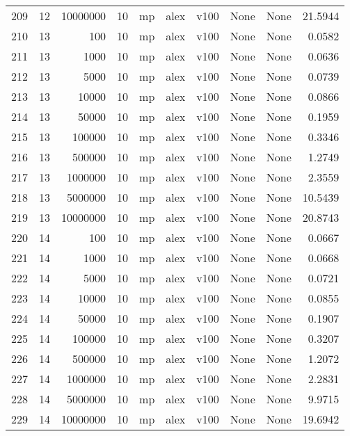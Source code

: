 \begin{tabular}{lrrrlllllr}
209 &  12 &  10000000 &      10 &   mp &  alex &  v100 &  None &  None &  21.5944 \\
210 &  13 &       100 &      10 &   mp &  alex &  v100 &  None &  None &   0.0582 \\
211 &  13 &      1000 &      10 &   mp &  alex &  v100 &  None &  None &   0.0636 \\
212 &  13 &      5000 &      10 &   mp &  alex &  v100 &  None &  None &   0.0739 \\
213 &  13 &     10000 &      10 &   mp &  alex &  v100 &  None &  None &   0.0866 \\
214 &  13 &     50000 &      10 &   mp &  alex &  v100 &  None &  None &   0.1959 \\
215 &  13 &    100000 &      10 &   mp &  alex &  v100 &  None &  None &   0.3346 \\
216 &  13 &    500000 &      10 &   mp &  alex &  v100 &  None &  None &   1.2749 \\
217 &  13 &   1000000 &      10 &   mp &  alex &  v100 &  None &  None &   2.3559 \\
218 &  13 &   5000000 &      10 &   mp &  alex &  v100 &  None &  None &  10.5439 \\
219 &  13 &  10000000 &      10 &   mp &  alex &  v100 &  None &  None &  20.8743 \\
220 &  14 &       100 &      10 &   mp &  alex &  v100 &  None &  None &   0.0667 \\
221 &  14 &      1000 &      10 &   mp &  alex &  v100 &  None &  None &   0.0668 \\
222 &  14 &      5000 &      10 &   mp &  alex &  v100 &  None &  None &   0.0721 \\
223 &  14 &     10000 &      10 &   mp &  alex &  v100 &  None &  None &   0.0855 \\
224 &  14 &     50000 &      10 &   mp &  alex &  v100 &  None &  None &   0.1907 \\
225 &  14 &    100000 &      10 &   mp &  alex &  v100 &  None &  None &   0.3207 \\
226 &  14 &    500000 &      10 &   mp &  alex &  v100 &  None &  None &   1.2072 \\
227 &  14 &   1000000 &      10 &   mp &  alex &  v100 &  None &  None &   2.2831 \\
228 &  14 &   5000000 &      10 &   mp &  alex &  v100 &  None &  None &   9.9715 \\
229 &  14 &  10000000 &      10 &   mp &  alex &  v100 &  None &  None &  19.6942 \\

\end{tabular}
